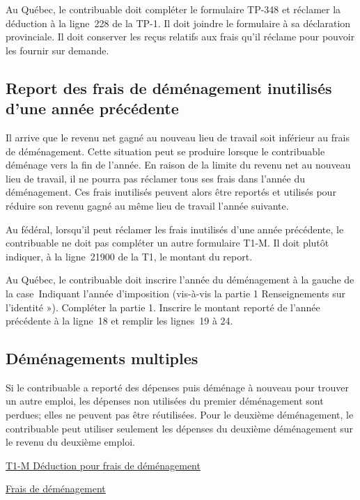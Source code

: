 Au Québec, le contribuable doit compléter le formulaire TP-348 et réclamer la déduction à la ligne~228 de la TP-1. Il doit joindre le formulaire à sa déclaration provinciale. Il doit conserver les reçus relatifs aux frais qu'il réclame pour pouvoir les fournir sur demande.


\subsection{Report des frais de déménagement inutilisés d'une année précédente}
Il arrive que le revenu net gagné au nouveau lieu de travail soit inférieur au frais de déménagement. Cette situation peut se produire lorsque le contribuable déménage vers la fin de l'année. En raison de la limite du revenu net au nouveau lieu de travail, il ne pourra pas réclamer tous ses frais dans l'année du déménagement. Ces frais inutilisés peuvent alors être reportés et utilisés pour réduire son revenu gagné au même lieu de travail l'année suivante.

Au fédéral, lorsqu'il peut réclamer les frais inutilisés d'une année précédente, le contribuable ne doit pas compléter un autre formulaire T1-M. Il doit plutôt indiquer, à la ligne~21900 de la T1, le montant du report. 

Au Québec, le contribuable doit inscrire l'année du déménagement à la gauche de la case~Indiquant l'année d'imposition (vis-à-vis la partie 1 \og Renseignements sur l'identité »). Compléter la partie 1. Inscrire le montant reporté de l'année précédente à la ligne~18 et remplir les lignes~19 à 24.


\subsection{Déménagements multiples}
Si le contribuable a reporté des dépenses puis déménage à nouveau pour trouver un autre emploi, les dépenses non utilisées du premier déménagement sont perdues; elles ne peuvent pas être réutilisées. Pour le deuxième déménagement, le contribuable peut utiliser seulement les dépenses du deuxième déménagement sur le revenu du deuxième emploi.

\cat\href{https://www.canada.ca/fr/agence-revenu/services/formulaires-publications/formulaires/t1-m.html}{T1-M Déduction pour frais de déménagement}

\qct\href{https://www.revenuquebec.ca/fr/services-en-ligne/formulaires-et-publications/details-courant/tp-348/}{Frais de déménagement}



